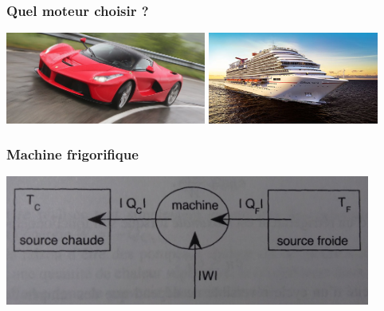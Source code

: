 \documentclass{beamer}
\begin{document}
\begin{frame}
\frametitle{Quel moteur choisir ?}
\centerline {\includegraphics[width=6.6cm]{voiture}
	\includegraphics[width=5.6cm]{bateau}}
\end{frame}


\begin{frame}
\frametitle{Machine frigorifique}
\centerline{\includegraphics[width=12cm]{machine_frigorifique}}
\end{frame}
\end{document}
